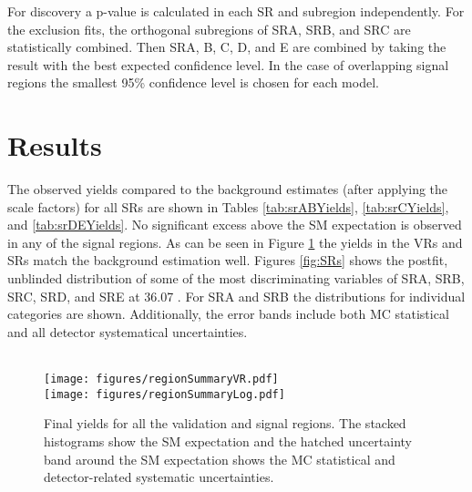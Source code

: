 For discovery a p-value is calculated in each SR and subregion independently.  For the exclusion fits, the orthogonal subregions of SRA, SRB, and SRC are statistically combined.  Then SRA, B, C, D, and E are combined by taking the result with the best expected confidence level. In the case of overlapping signal regions the smallest 95\% confidence level is chosen for each model.

\section{Results}
\label{sec:results}



The observed yields compared to the background estimates (after applying the scale factors) for all SRs are shown in Tables \ref{tab:srABYields}, \ref{tab:srCYields}, and \ref{tab:srDEYields}.  No significant excess above the SM expectation is observed in any of the signal regions. As can be seen in Figure \ref{fig:srSum} the yields in the VRs and SRs match the background estimation well. Figures \ref{fig:SRs} shows the postfit, unblinded distribution of some of the most discriminating variables of SRA, SRB, SRC, SRD, and SRE at 36.07 \ifb. For SRA and SRB the distributions for individual categories are shown. Additionally, the error bands include both MC statistical and all detector systematical uncertainties. \\ %

\\

 

\begin{figure}[!hp] 
\begin{center}
 \texttt{[image: figures/regionSummaryVR.pdf]}\\ %
 \texttt{[image: figures/regionSummaryLog.pdf]}%
    \caption[Final yields for all the validation and signal regions]{Final yields for all the validation and signal regions. The stacked histograms show the SM expectation and the hatched uncertainty band around the SM expectation shows the MC statistical and detector-related systematic uncertainties.}
    \label{fig:srSum}
\end{center}
\end{figure}
\clearpage

